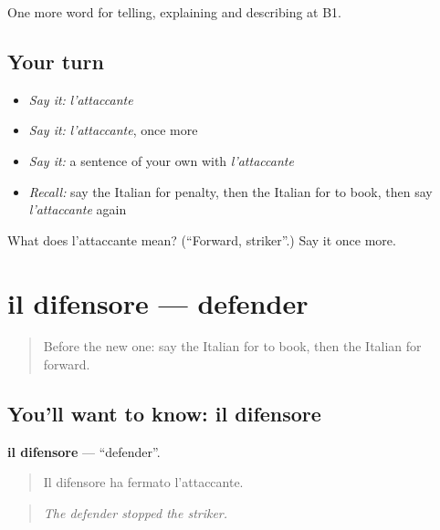 \begin{grammarlens}[title={What you've built}]
One more word for telling, explaining and describing at B1.
\end{grammarlens}

\subsection*{Your turn}
\begin{itemize}
\raggedright
  \item \emph{Say it:} \emph{l'attaccante}
  \item \emph{Say it:} \emph{l'attaccante}, once more
  \item \emph{Say it:} a sentence of your own with \emph{l'attaccante}
  \item \emph{Recall:} say the Italian for penalty, then the Italian for to book, then say \emph{l'attaccante} again
\end{itemize}

\begin{tcolorbox}[breakable,colback=teal!4,colframe=teal!35!black,title={Before you move on}]
What does l'attaccante mean? (\textquotedblleft{}Forward, striker\textquotedblright{}.) Say it once more.
\end{tcolorbox}
\section[il difensore]{il difensore — defender}

\label{lesson:IT-C510-difensore}



\begin{quote}
Before the new one: say the Italian for to book, then the Italian for forward.
\end{quote}

\subsection*{You'll want to know: il difensore}
\textbf{il difensore} — \textquotedblleft{}defender\textquotedblright{}.

\begin{quote}
Il difensore ha fermato l'attaccante.
\end{quote}

\begin{quote}
\emph{The defender stopped the striker.}
\end{quote}

